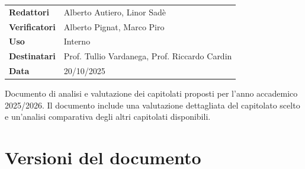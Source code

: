 \documentclass[a4paper,11pt]{article}
\begin{document}
\begin{center}
\begin{tcolorbox}[colback=lightgray,colframe=primaryblue,width=0.85\textwidth,arc=3mm,boxrule=0.5pt]
\begin{tabular}{@{}ll@{}}
\textbf{Redattori}    & Alberto Autiero, Linor Sadè\\
\textbf{Verificatori} & Alberto Pignat, Marco Piro \\
\textbf{Uso}          & Interno \\
\textbf{Destinatari}  & Prof. Tullio Vardanega, Prof. Riccardo Cardin \\
\textbf{Data}         & 20/10/2025 \\
\end{tabular}
\end{tcolorbox}
\end{center}

\vspace{0.5cm}

\begin{center}
\begin{tcolorbox}[colback=secondaryblue!10,colframe=secondaryblue,width=0.9\textwidth,arc=3mm,boxrule=0.8pt,title={\bfseries Abstract}]
Documento di analisi e valutazione dei capitolati proposti per l'anno accademico 2025/2026. Il documento include una valutazione dettagliata del capitolato scelto e un'analisi comparativa degli altri capitolati disponibili.
\end{tcolorbox}
\end{center}

\newpage
\section{Versioni del documento}

\setlength{\extrarowheight}{2pt} %
\renewcommand{\arraystretch}{1.5} 
\end{document}
